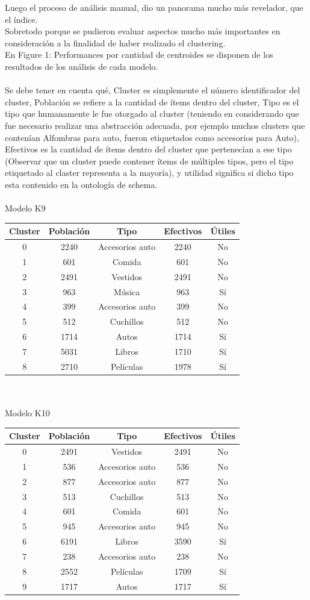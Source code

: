 Luego el proceso de análisis manual, dio un panorama mucho más revelador, que el índice.\\
Sobretodo porque se pudieron evaluar aspectos mucho más importantes en consideración a la finalidad de haber realizado el clustering.\\
En Figure 1: Performances por cantidad de centroides se disponen de los resultados de los análisis de cada modelo.\\
\\
Se debe tener en cuenta qué, Cluster es simplemente el número identificador del cluster, Población se refiere a la cantidad de ítems 
dentro del cluster, Tipo es el tipo que humanamente le fue otorgado al cluster (teniendo en considerando que fue necesario realizar una 
abstracción adecuada, por ejemplo muchos clusters que contenían Alfombras para auto, fueron etiquetados como accesorios para Auto), Efectivos 
es la cantidad de ítems dentro del cluster que pertenecían a ese tipo (Observar que un cluster puede contener ítems de múltiples tipos, pero el tipo 
etiquetado al claster representa a la mayoría), y utilidad significa si dicho tipo esta contenido en la ontología de schema.\\
\\
Modelo K9\\
\begin{tabular}{| c | c | c | c | c |}\hline
Cluster & Población & Tipo & Efectivos & Útiles\\\hline
0 & 2240 & Accesorios auto & 2240 & No\\
1 & 601 & Comida & 601 & No\\
2 & 2491 & Vestidos & 2491 & No\\
3 & 963 & Música & 963 & Sí\\
4 & 399 & Accesorios auto & 399 & No\\
5 & 512 & Cuchillos & 512 & No\\
6 & 1714 & Autos & 1714 & Sí\\
7 & 5031 & Libros & 1710 & Sí\\
8 & 2710 & Películas & 1978 & Sí\\\hline
\end{tabular}
\\
\\
Modelo K10\\
\begin{tabular}{| c | c | c | c | c |}\hline
Cluster & Población & Tipo & Efectivos & Útiles\\\hline
0 & 2491 & Vestidos & 2491 & No\\
1 & 536 & Accesorios auto & 536 & No\\
2 & 877 & Accesorios auto & 877 & No\\
3 & 513 & Cuchillos & 513 & No\\
4 & 601 & Comida & 601 & No\\
5 & 945 & Accesorios auto & 945 & No\\
6 & 6191 & Libros & 3590 & Sí\\
7 & 238 & Accesorios auto & 238 & No\\
8 & 2552 & Películas & 1709 & Sí\\
9 & 1717 & Autos & 1717 & Sí\\\hline
\end{tabular}
